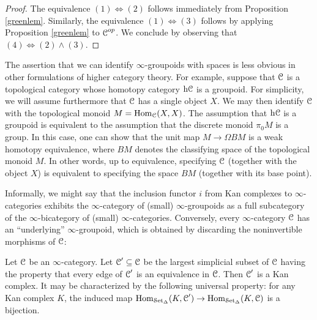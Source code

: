 \begin{1.2.5 inf-gpoids and classical homotopy}
\begin{proof}
The equivalence $(1) \Leftrightarrow (2)$ follows immediately from
Proposition \ref{greenlem}.
Similarly, the equivalence $(1) \Leftrightarrow (3)$ follows by applying Proposition \ref{greenlem} to $\operatorname{\mathcal{C}}^{op}$. We conclude by observing that $(4) \Leftrightarrow (2) \wedge (3)$.
\end{proof}

\begin{remark}
The assertion that we can identify $\infty$-groupoids with spaces is less obvious in other formulations of higher category theory. For example, suppose that $\operatorname{\mathcal{C}}$ is a topological category whose homotopy category $\rm{h} \it{\operatorname{\mathcal{C}}}$ is a groupoid. For simplicity, we will assume furthermore that $\operatorname{\mathcal{C}}$ has a single object $X$. We may then identify $\operatorname{\mathcal{C}}$ with
the topological monoid $M=\operatorname{Hom}_{\operatorname{\mathcal{C}}}(X,X)$. The assumption that
$\rm{h} \it{ \operatorname{\mathcal{C}}}$ is a groupoid is equivalent to the assumption
that the discrete monoid $\pi_0 M$ is a group. In this case, one can show that the 
unit map $M \rightarrow \Omega BM$ is a weak homotopy
equivalence, where $BM$ denotes the classifying space of the
topological monoid $M$. In other words, up to equivalence,
specifying $\operatorname{\mathcal{C}}$ (together with the object $X$) is equivalent to
specifying the space $BM$ (together with its base point).
\end{remark}

Informally, we might say that the inclusion functor $i$ from Kan
complexes to $\infty$-categories exhibits the $\infty$-category of
(small) $\infty$-groupoids as a full subcategory of
the $\infty$-bicategory of (small) $\infty$-categories. Conversely, every
$\infty$-category $\operatorname{\mathcal{C}}$ has an ``underlying'' $\infty$-groupoid, which is obtained by discarding the noninvertible morphisms of $\operatorname{\mathcal{C}}$:

\begin{proposition}\label{lumba}
Let $\operatorname{\mathcal{C}}$ be an $\infty$-category. Let $\operatorname{\mathcal{C}}' \subseteq \operatorname{\mathcal{C}}$ be the largest simplicial
subset of $\operatorname{\mathcal{C}}$ having the property that every edge of $\operatorname{\mathcal{C}}'$ is an equivalence in $\operatorname{\mathcal{C}}$.
Then $\operatorname{\mathcal{C}}'$ is a Kan complex. It may be characterized by the
following universal property: for any Kan complex $K$, the induced
map $\operatorname{Hom}_{\operatorname{\mathcal{S}et_{\Delta}}}(K,\operatorname{\mathcal{C}}') \rightarrow \operatorname{Hom}_{\operatorname{\mathcal{S}et_{\Delta}}}(K,\operatorname{\mathcal{C}})$ is a
bijection.
\end{proposition}


\end{1.2.5 inf-gpoids and classical homotopy}

